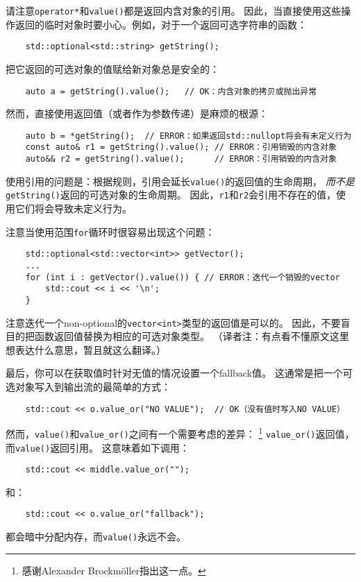 请注意\texttt{operator*}和\texttt{value()}都是返回内含对象的引用。
因此，当直接使用这些操作返回的临时对象时要小心。例如，对于一个返回可选字符串的函数：
\begin{lstlisting}
    std::optional<std::string> getString();
\end{lstlisting}
把它返回的可选对象的值赋给新对象总是安全的：
\begin{lstlisting}
    auto a = getString().value();   // OK：内含对象的拷贝或抛出异常
\end{lstlisting}
然而，直接使用返回值（或者作为参数传递）是麻烦的根源：
\begin{lstlisting}
    auto b = *getString();  // ERROR：如果返回std::nullopt将会有未定义行为
    const auto& r1 = getString().value(); // ERROR：引用销毁的内含对象
    auto&& r2 = getString().value();      // ERROR：引用销毁的内含对象
\end{lstlisting}
使用引用的问题是：根据规则，引用会延长\texttt{value()}的返回值的生命周期，
\emph{而不是}\texttt{getString()}返回的可选对象的生命周期。
因此，\texttt{r1}和\texttt{r2}会引用不存在的值，使用它们将会导致未定义行为。

注意当使用范围\texttt{for}循环时很容易出现这个问题：
\begin{lstlisting}
    std::optional<std::vector<int>> getVector();
    ...
    for (int i : getVector().value()) { // ERROR：迭代一个销毁的vector
        std::cout << i << '\n';
    }
\end{lstlisting}
注意迭代一个non-optional的\texttt{vector<int>}类型的返回值是可以的。
因此，不要盲目的把函数返回值替换为相应的可选对象类型。
（译者注：有点看不懂原文这里想表达什么意思，暂且就这么翻译。）

最后，你可以在获取值时针对无值的情况设置一个fallback值。
这通常是把一个可选对象写入到输出流的最简单的方式：
\begin{lstlisting}
    std::cout << o.value_or("NO VALUE");  // OK（没有值时写入NO VALUE）
\end{lstlisting}
然而，\texttt{value()}和\texttt{value\_or()}之间有一个需要考虑的差异：
\footnote{感谢Alexander Brockmöller指出这一点。}
\texttt{value\_or()}返回值，而\texttt{value()}返回引用。
这意味着如下调用：
\begin{lstlisting}
    std::cout << middle.value_or("");
\end{lstlisting}
和：
\begin{lstlisting}
    std::cout << o.value_or("fallback");
\end{lstlisting}
都会暗中分配内存，而\texttt{value()}永远不会。

